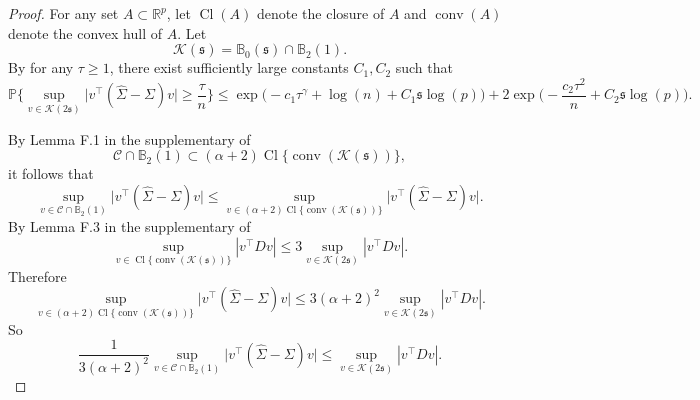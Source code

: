 \documentclass[11pt]{article}
\newcommand{\s}{ { \mathfrak{s}  } }
\newcommand{\p}{\mathbb P}
\DeclareMathOperator*{\CL}{Cl}
\DeclareMathOperator*{\conv}{conv}
\theoremstyle{plain}
\theoremstyle{definition}
\begin{document}
\begin{proof}
For any set $A \subset \mathbb R^p$, let $\CL(A) $ denote the closure of $A$ and $\conv(A) $ denote the convex hull of $A$. Let  
 $$\mathcal K(\s) = \mathbb B_0(\s) \cap \mathbb B_2(1)  .$$ 
By 
   for any $\tau\ge  1$, there exist  sufficiently large constants
    $C_1, C_2$ such that  
$$ \p\bigg\{  \sup_{v \in \mathcal K(2\s) } \bigg| v^\top (\widehat \Sigma - \Sigma ) v\bigg| \ge     \frac{\tau}{n }  \bigg\} 
\le    \exp\Big(-c_1  \tau ^{\gamma} +\log(n)+C _1\s\log(p) \Big) + 2 \exp\Big(-\frac{c_2 \tau ^2}{ n   }  +C_2 \s\log(p)  \Big) .
$$ 
 
  By Lemma F.1  in the supplementary of   \cite{basu2015regularized}
 $$  \mathcal C \cap   \mathbb  B_2(1)   \subset (\alpha +2) \CL \{ \conv ( \mathcal K (\s) )\} ,$$
 it follows that
 $$ \sup_{ v\in \mathcal C \cap \mathbb B_2(1) } \bigg| v^\top  (\widehat \Sigma -\Sigma )v\bigg|   
 \le 
\sup_{ v\in (\alpha +2) \CL \{ \conv ( \mathcal K (\s) )\}  }   \bigg| v^\top  (\widehat \Sigma -\Sigma )v\bigg|   .$$
By Lemma F.3  in the supplementary of   \cite{basu2015regularized}
$$ \sup_{ v \in \CL \{ \conv (\mathcal K(\s) )\} } | v^\top D v|  \le 3 \sup_{ v \in \mathcal K(2\s)} |v^\top D v| . $$
Therefore 
$$ 
\sup_{ v\in (\alpha +2) \CL \{ \conv ( \mathcal K (\s) )\}  }   \bigg| v^\top  (\widehat \Sigma -\Sigma )v\bigg|   
\le 3 (\alpha +2)^2 \sup_{ v \in \mathcal K(2\s)} |v^\top D v|  .$$
So
 $$ 
 \frac{1}{ 3(\alpha +2 )^2 }\sup_{  v\in \mathcal C \cap \mathbb B_2(1)   }   \bigg| v^\top  (\widehat \Sigma -\Sigma )v\bigg|   
\le  \sup_{ v \in \mathcal K(2\s)} |v^\top D v| .$$


\end{proof}
\end{document}
